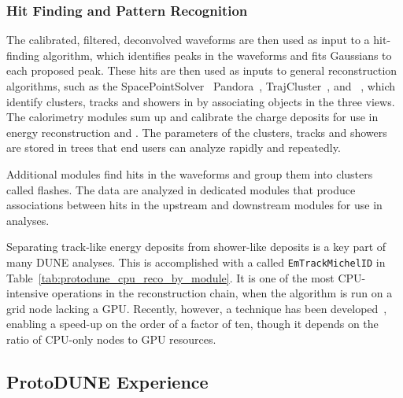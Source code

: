 \documentclass[../main-v1.tex]{subfiles}
\begin{document}
\subsubsection{Hit Finding and Pattern Recognition}

The calibrated, filtered, deconvolved waveforms are then used as input to a hit-finding algorithm, which identifies peaks in the waveforms and fits Gaussians to each proposed peak.  These hits are then used as inputs to general reconstruction algorithms, such as the SpacePointSolver~\cite{DUNE:2020ypp} Pandora~\cite{Marshall:2015rfa}, TrajCluster~\cite{ref:trajcluster}, and ~\cite{ref:PMA}, which identify clusters, tracks and showers in \threed by associating objects in the three \twod views.  The calorimetry modules sum up and calibrate the charge deposits for use in energy reconstruction and .  The parameters of the clusters, tracks and showers are stored in  trees that end users can analyze rapidly and repeatedly.

Additional modules find hits in the  waveforms and group them into clusters called flashes.  The  data are analyzed in dedicated modules that produce associations between hits in the upstream and downstream  modules for use in analyses.

Separating track-like energy deposits from shower-like deposits is a key part of many DUNE analyses.  This is accomplished with a  called {\tt EmTrackMichelID} in Table~\ref{tab:protodune_cpu_reco_by_module}.  It is one of the most CPU-intensive operations in the  reconstruction chain, when the algorithm is run on a grid node lacking a GPU.  Recently, however, a  technique has been developed~\cite{Wang:2020fjr}, enabling a speed-up on the order of a factor of ten, though it depends on the ratio of CPU-only nodes to GPU resources.


\subsection{ProtoDUNE Experience}
\end{document}
